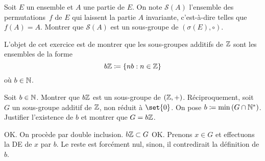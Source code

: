 \documentclass{magnolia}
\begin{document}
Soit $E$ un ensemble et $A$ une partie de $E$. On note $\mathcal{S}(A)$
l'ensemble des permutations~$f$ de $E$ qui laissent la partie $A$ invariante,
c'est-à-dire telles que $f(A)=A$. Montrer que $\mathcal{S}(A)$ est un
sous-groupe de $(\sigma(E),\circ)$.

L'objet de cet exercice est de montrer que les sous-groupes additifs de $\mathbb{Z}$
sont les ensembles de la forme
\[b\mathbb{Z}\coloneqq\left\{nb : n\in\mathbb{Z}\right\}\]
où $b\in\mathbb{N}$.
\begin{questions}
\question Soit $b\in\mathbb{N}$. Montrer que $b\mathbb{Z}$ est un sous-groupe de $\left(\mathbb{Z},+\right)$.
\question Réciproquement, soit $G$ un sous-groupe additif de $\mathbb{Z}$, non réduit à $\set{0}$. On pose
  $b\coloneqq\min\left(G\cap{\mathbb{N}^*}\right)$. Justifier l'existence de $b$ et montrer que $G=b\mathbb{Z}$.
\end{questions}
\begin{sol}
\begin{questions}
\question OK.
\question On procède par double inclusion. $b\mathbb{Z}\subset G$ OK. Prenons $x\in G$ et effectuons la DE de $x$ par $b$. Le reste est forcément nul, sinon, il contredirait la définition de $b$.
\end{questions}
\end{sol}
\end{document}
